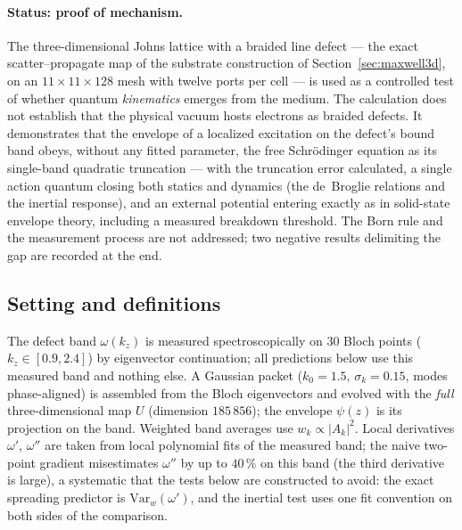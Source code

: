 \documentclass[11pt,a4paper]{article}
\theoremstyle{plain}
\theoremstyle{remark}
\begin{document}
\paragraph{Status: proof of mechanism.} The three-dimensional Johns lattice with a braided line defect --- the exact scatter--propagate map of the substrate construction of Section~\ref{sec:maxwell3d}, on an $11\times11\times128$ mesh with twelve ports per cell --- is used as a controlled test of whether quantum \emph{kinematics} emerges from the medium. The calculation does not establish that the physical vacuum hosts electrons as braided defects. It demonstrates that the envelope of a localized excitation on the defect's bound band obeys, without any fitted parameter, the free Schr\"odinger equation as its single-band quadratic truncation --- with the truncation error calculated, a single action quantum closing both statics and dynamics (the de~Broglie relations and the inertial response), and an external potential entering exactly as in solid-state envelope theory, including a measured breakdown threshold. The Born rule and the measurement process are not addressed; two negative results delimiting the gap are recorded at the end.

\subsection{Setting and definitions}
The defect band $\omega(k_z)$ is measured spectroscopically on 30 Bloch points ($k_z \in [0.9, 2.4]$) by eigenvector continuation; all predictions below use this measured band and nothing else. A Gaussian packet ($k_0 = 1.5$, $\sigma_k = 0.15$, modes phase-aligned) is assembled from the Bloch eigenvectors and evolved with the \emph{full} three-dimensional map $U$ (dimension $185\,856$); the envelope $\psi(z)$ is its projection on the band. Weighted band averages use $w_k \propto |A_k|^2$. Local derivatives $\omega'$, $\omega''$ are taken from local polynomial fits of the measured band; the naive two-point gradient misestimates $\omega''$ by up to $40\,\%$ on this band (the third derivative is large), a systematic that the tests below are constructed to avoid: the exact spreading predictor is $\mathrm{Var}_w(\omega')$, and the inertial test uses one fit convention on both sides of the comparison.
\end{document}
